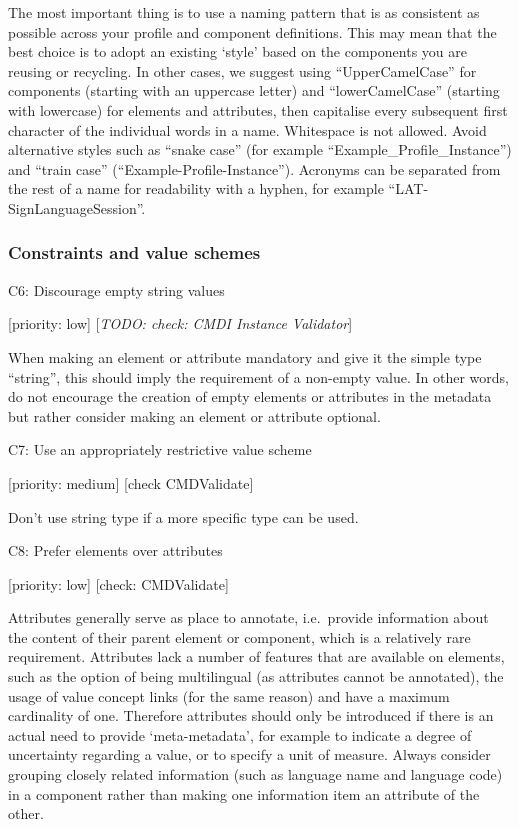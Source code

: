 The most important thing is to use a naming pattern that is as
consistent as possible across your profile and component definitions.
This may mean that the best choice is to adopt an existing `style' based
on the components you are reusing or recycling. In other cases, we
suggest using ``UpperCamelCase'' for components (starting with an
uppercase letter) and ``lowerCamelCase'' (starting with lowercase) for
elements and attributes, then capitalise every subsequent first
character of the individual words in a name. Whitespace is not allowed.
Avoid alternative styles such as ``snake case'' (for example
``Example\_Profile\_Instance'') and ``train case''
(``Example-Profile-Instance''). Acronyms can be separated from the rest
of a name for readability with a hyphen, for example
``LAT-SignLanguageSession''.

\hypertarget{constraints-and-value-schemes}{\subsubsection{Constraints
and value schemes}\label{constraints-and-value-schemes}}

C6: Discourage empty string values

{[}priority: low{]} {[}\emph{TODO: check: CMDI Instance Validator}{]}

When making an element or attribute mandatory and give it the simple
type ``string'', this should imply the requirement of a non-empty value.
In other words, do not encourage the creation of empty elements or
attributes in the metadata but rather consider making an element or
attribute optional.

C7: Use an appropriately restrictive value scheme

{[}priority: medium{]} {[}check CMDValidate{]}

Don't use string type if a more specific type can be used.

C8: Prefer elements over attributes

{[}priority: low{]} {[}check: CMDValidate{]}

Attributes generally serve as place to annotate, i.e.~provide
information about the content of their parent element or component,
which is a relatively rare requirement. Attributes lack a number of
features that are available on elements, such as the option of being
multilingual (as attributes cannot be annotated), the usage of value
concept links (for the same reason) and have a maximum cardinality of
one. Therefore attributes should only be introduced if there is an
actual need to provide `meta-metadata', for example to indicate a degree
of uncertainty regarding a value, or to specify a unit of measure.
Always consider grouping closely related information (such as language
name and language code) in a component rather than making one
information item an attribute of the other.

